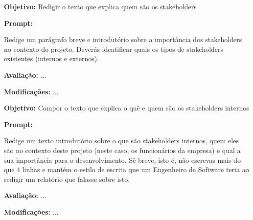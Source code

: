 \documentclass[a4paper,12pt]{scrreprt}
\begin{document}
\begin{tcolorbox}[
	title={Prompt P10 - Formulação do texto introdutório sobre a identificação dos stakeholders},
	colback=white,
	colframe=black,
	arc=2mm,
	boxrule=0.5pt
	]
	\textbf{Objetivo:} Redigir o texto que explica quem são os stakeholders \par
	\textbf{Prompt:} 
	\begin{tcolorbox}[
		listing only,
		breakable,
		enhanced,
		colback=white,
		colframe=black,
		listing options={
			breaklines=true,
			basicstyle=\ttfamily\small
		}
		]
		Redige um parágrafo breve e introdutório sobre a importância dos stakeholders no contexto do projeto. Deverás identificar quais os tipos de stakeholders existentes (internos e externos).
	\end{tcolorbox}
	\par
	\textbf{Avaliação:} ... \par
	\textbf{Modificações:} ... \par
\end{tcolorbox}

\begin{tcolorbox}[
	title={Prompt P11 - Escrita do texto introdutório dos stakeholders internos},
	colback=white,
	colframe=black,
	arc=2mm,
	boxrule=0.5pt
	]
	\textbf{Objetivo:} Compor o texto que explica o quê e quem são os stakeholders internos \par
	\textbf{Prompt:} 
	\begin{tcolorbox}[
		listing only,
		breakable,
		enhanced,
		colback=white,
		colframe=black,
		listing options={
			breaklines=true,
			basicstyle=\ttfamily\small
		}
		]
		Redige um texto introdutório sobre o que são stakeholders internos, quem eles são no contexto deste projeto (neste caso, os funcionários da empresa) e qual a sua importância para o desenvolvimento. 
Sê breve, isto é, não escrevas mais do que 4 linhas e mantém o estilo de escrita que um Engenheiro de Software teria ao redigir um relatório que falasse sobre isto.
	\end{tcolorbox}
	\par
	\textbf{Avaliação:} ... \par
	\textbf{Modificações:} ... \par
\end{tcolorbox}
\end{document}
